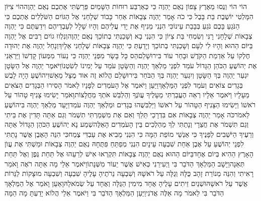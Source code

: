 \documentclass[../main/main.tex]{subfiles}
\begin{document}
\begin{multicols}{\ncols}
הוֹי הוֹי וְנֻסוּ מֵאֶרֶץ צָפוֹן נְאֻם יַהְוֶה כִּי כְּאַרְבַּע רוּחוֹת הַשָּׁמַיִם פֵּרַשְׂתִּי אֶתְכֶם נְאֻם יַהְוֶה\PreVerseSpace{}הוֹי צִיּוֹן הִמָּלְטִי יוֹשֶׁבֶת בַּת בָּבֶל \ClosedSection{}כִּי כֹה אָמַר יַהְוֶה צְבָאוֹת אַחַר כָּבוֹד שְׁלָחַנִי אֶל הַגּוֹיִם הַשֹּׁלְלִים אֶתְכֶם כִּי הַנֹּגֵעַ בָּכֶם נֹגֵעַ בְּבָבַת עֵינוֹ\PreVerseSpace{}כִּי הִנְנִי מֵנִיף אֶת יָדִי עֲלֵיהֶם וְהָיוּ שָׁלָל לְעַבְדֵיהֶם וִידַעְתֶּם כִּי יַהְוֶה צְבָאוֹת שְׁלָחָנִי \ClosedSection{}רָנִּי וְשִׂמְחִי בַּת צִיּוֹן כִּי הִנְנִי בָא וְשָׁכַנְתִּי בְתוֹכֵךְ נְאֻם יַהְוֶה\PreVerseSpace{}וְנִלְווּ גוֹיִם רַבִּים אֶל יַהְוֶה בַּיּוֹם הַהוּא וְהָיוּ לִי לְעָם וְשָׁכַנְתִּי בְתוֹכֵךְ וְיָדַעַתְּ כִּי יַהְוֶה צְבָאוֹת שְׁלָחַנִי אֵלָיִךְ\PreVerseSpace{}וְנָחַל יַהְוֶה אֶת יְהוּדָה חֶלְקוֹ עַל אַדְמַת הַקֹּדֶשׁ וּבָחַר עוֹד בִּירוּשָׁלֵם\PreVerseSpace{}הַס כָּל בָּשָׂר מִפְּנֵי יַהְוֶה כִּי נֵעוֹר מִמְּעוֹן קָדְשׁוֹ \ClosedSection{}וַיַּרְאֵנִי אֶת יְהוֹשֻׁעַ הַכֹּהֵן הַגָּדוֹל עֹמֵד לִפְנֵי מַלְאַךְ יַהְוֶה וְהַשָּׂטָן עֹמֵד עַל יְמִינוֹ לְשִׂטְנוֹ\PreVerseSpace{}וַיֹּאמֶר יַהְוֶה אֶל הַשָּׂטָן יִגְעַר יַהְוֶה בְּךָ הַשָּׂטָן וְיִגְעַר יַהְוֶה בְּךָ הַבֹּחֵר בִּירוּשָׁלֵם הֲלוֹא זֶה אוּד מֻצָּל מֵאֵשׁ\PreVerseSpace{}וִיהוֹשֻׁעַ הָיָה לָבֻשׁ בְּגָדִים צוֹאִים וְעֹמֵד לִפְנֵי הַמַּלְאָךְ\PreVerseSpace{}וַיַּעַן וַיֹּאמֶר אֶל הָעֹמְדִים לְפָנָיו לֵאמֹר הָסִירוּ הַבְּגָדִים הַצֹּאִים מֵעָלָיו וַיֹּאמֶר אֵלָיו רְאֵה הֶעֱבַרְתִּי מֵעָלֶיךָ עֲוֺנֶךָ וְהַלְבֵּשׁ אֹתְךָ מַחֲלָצוֹת\PreVerseSpace{}וָאֹמַר יָשִׂימוּ צָנִיף טָהוֹר עַל רֹאשׁוֹ וַיָּשִׂימוּ הַצָּנִיף הַטָּהוֹר עַל רֹאשׁוֹ וַיַּלְבִּשֻׁהוּ בְּגָדִים וּמַלְאַךְ יַהְוֶה עֹמֵד\PreVerseSpace{}וַיָּעַד מַלְאַךְ יַהְוֶה בִּיהוֹשֻׁעַ לֵאמֹר\PreVerseSpace{}כֹּה אָמַר יַהְוֶה צְבָאוֹת אִם בִּדְרָכַי תֵּלֵךְ וְאִם אֶת מִשְׁמַרְתִּי תִשְׁמֹר וְגַם אַתָּה תָּדִין אֶת בֵּיתִי וְגַם תִּשְׁמֹר אֶת חֲצֵרָי וְנָתַתִּי לְךָ מַהְלְכִים בֵּין הָעֹמְדִים הָאֵלֶּה\PreVerseSpace{}שְׁמַע נָא יְהוֹשֻׁעַ הַכֹּהֵן הַגָּדוֹל אַתָּה וְרֵעֶיךָ הַיֹּשְׁבִים לְפָנֶיךָ כִּי אַנְשֵׁי מוֹפֵת הֵמָּה כִּי הִנְנִי מֵבִיא אֶת עַבְדִּי צֶמַח\PreVerseSpace{}כִּי הִנֵּה הָאֶבֶן אֲשֶׁר נָתַתִּי לִפְנֵי יְהוֹשֻׁעַ עַל אֶבֶן אַחַת שִׁבְעָה עֵינָיִם הִנְנִי מְפַתֵּחַ פִּתֻּחָהּ נְאֻם יַהְוֶה צְבָאוֹת וּמַשְׁתִּי אֶת עֲוֺן הָאָרֶץ הַהִיא בְּיוֹם אֶחָד\PreVerseSpace{}בַּיּוֹם הַהוּא נְאֻם יַהְוֶה צְבָאוֹת תִּקְרְאוּ אִישׁ לְרֵעֵהוּ אֶל תַּחַת גֶּפֶן וְאֶל תַּחַת תְּאֵנָה\PreChapterSpace{}וַיָּשָׁב הַמַּלְאָךְ הַדֹּבֵר בִּי וַיְעִירֵנִי כְּאִישׁ אֲשֶׁר יֵעוֹר מִשְּׁנָתוֹ\PreVerseSpace{}וַיֹּאמֶר אֵלַי מָה אַתָּה רֹאֶה וָאֹמַר\SubEnd{} רָאִיתִי וְהִנֵּה מְנוֹרַת זָהָב כֻּלָּהּ וְגֻלָּה עַל רֹאשָׁהּ וְשִׁבְעָה נֵרֹתֶיהָ עָלֶיהָ שִׁבְעָה וְשִׁבְעָה מוּצָקוֹת לַנֵּרוֹת אֲשֶׁר עַל רֹאשָׁהּ\PreVerseSpace{}וּשְׁנַיִם זֵיתִים עָלֶיהָ אֶחָד מִימִין הַגֻּלָּה וְאֶחָד עַל שְׂמֹאלָהּ\PreVerseSpace{}וָאַעַן וָאֹמַר אֶל הַמַּלְאָךְ הַדֹּבֵר בִּי לֵאמֹר מָה אֵלֶּה אֲדֹנִי\PreVerseSpace{}וַיַּעַן הַמַּלְאָךְ הַדֹּבֵר בִּי וַיֹּאמֶר אֵלַי הֲלוֹא יָדַעְתָּ מָה הֵמָּה 
\end{multicols}
\end{document}
